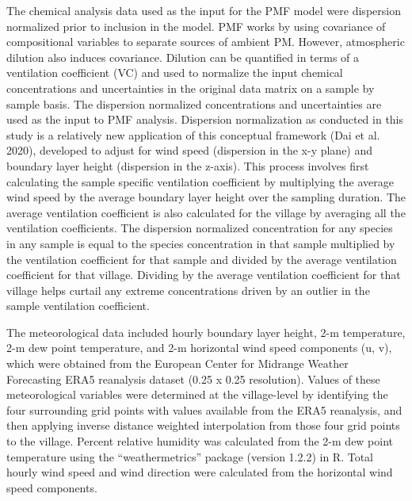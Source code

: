 \documentclass[
  letterpaper,
  DIV=11,
  numbers=noendperiod]{scrartcl}
\begin{document}
The chemical analysis data used as the input for the PMF model were
dispersion normalized prior to inclusion in the model. PMF works by
using covariance of compositional variables to separate sources of
ambient PM. However, atmospheric dilution also induces covariance.
Dilution can be quantified in terms of a ventilation coefficient (VC)
and used to normalize the input chemical concentrations and
uncertainties in the original data matrix on a sample by sample basis.
The dispersion normalized concentrations and uncertainties are used as
the input to PMF analysis. Dispersion normalization as conducted in this
study is a relatively new application of this conceptual framework (Dai
et al. 2020), developed to adjust for wind speed (dispersion in the x-y
plane) and boundary layer height (dispersion in the z-axis). This
process involves first calculating the sample specific ventilation
coefficient by multiplying the average wind speed by the average
boundary layer height over the sampling duration. The average
ventilation coefficient is also calculated for the village by averaging
all the ventilation coefficients. The dispersion normalized
concentration for any species in any sample is equal to the species
concentration in that sample multiplied by the ventilation coefficient
for that sample and divided by the average ventilation coefficient for
that village. Dividing by the average ventilation coefficient for that
village helps curtail any extreme concentrations driven by an outlier in
the sample ventilation coefficient.

The meteorological data included hourly boundary layer height, 2-m
temperature, 2-m dew point temperature, and 2-m horizontal wind speed
components (u, v), which were obtained from the European Center for
Midrange Weather Forecasting ERA5 reanalysis dataset (0.25 x 0.25
resolution). Values of these meteorological variables were determined at
the village-level by identifying the four surrounding grid points with
values available from the ERA5 reanalysis, and then applying inverse
distance weighted interpolation from those four grid points to the
village. Percent relative humidity was calculated from the 2-m dew point
temperature using the ``weathermetrics'' package (version 1.2.2) in R.
Total hourly wind speed and wind direction were calculated from the
horizontal wind speed components.
\end{document}
